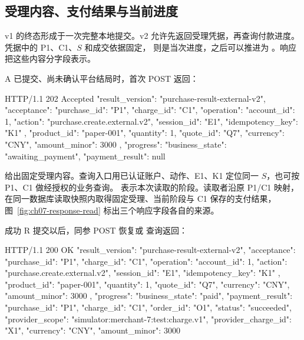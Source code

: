 \subsection*{受理内容、支付结果与当前进度}

v1 的终态形成于一次完整本地提交。v2 允许先返回受理凭据，再查询付款进度。凭据中的 P1、C1、\(S\) 和成交依据固定， 则是当次进度，之后可以推进为 。响应把这些内容分字段表示。

A 已提交、尚未确认平台结局时，首次 POST 返回：

\begin{BookCode}
HTTP/1.1 202 Accepted
{
  "result_version": "purchase-result-external-v2",
  "acceptance": {
    "purchase_id": "P1", "charge_id": "C1",
    "operation": {
      "account_id": 1,
      "action": "purchase.create.external.v2",
      "session_id": "E1", "idempotency_key": "K1"
    },
    "product_id": "paper-001", "quantity": 1,
    "quote_id": "Q7", "currency": "CNY",
    "amount_minor": 3000
  },
  "progress": {"business_state": "awaiting_payment"},
  "payment_result": null
}
\end{BookCode}

 给出固定受理内容。查询入口用已认证账户、动作、E1、K1 定位同一 \(S\)，也可按 P1、C1 做经授权的业务查询。 表示本次读取的阶段。读取者沿原 P1/C1 映射，在同一数据库读取快照内取得固定受理、当前阶段与 C1 保存的支付结果，图~\ref{fig:ch07-response-read} 标出三个响应字段各自的来源。


成功 R 提交以后，同参 POST 恢复或  查询返回：

\begin{BookCode}
HTTP/1.1 200 OK
{
  "result_version": "purchase-result-external-v2",
  "acceptance": {
    "purchase_id": "P1", "charge_id": "C1",
    "operation": {
      "account_id": 1,
      "action": "purchase.create.external.v2",
      "session_id": "E1", "idempotency_key": "K1"
    },
    "product_id": "paper-001", "quantity": 1,
    "quote_id": "Q7", "currency": "CNY",
    "amount_minor": 3000
  },
  "progress": {"business_state": "paid"},
  "payment_result": {
    "purchase_id": "P1", "charge_id": "C1", "order_id": "O1",
    "status": "succeeded",
    "provider_scope": "simulator:merchant-7:test:charge.v1",
    "provider_charge_id": "X1",
    "currency": "CNY", "amount_minor": 3000
  }
}
\end{BookCode}

